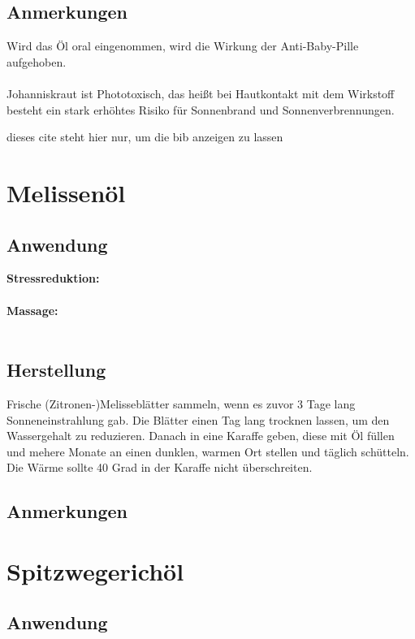 \subsection{Anmerkungen}

Wird das Öl oral eingenommen, wird die Wirkung der Anti-Baby-Pille aufgehoben.\\ \\
Johanniskraut ist Phototoxisch, das heißt bei Hautkontakt mit dem Wirkstoff besteht ein stark erhöhtes Risiko für Sonnenbrand und Sonnenverbrennungen.



dieses cite steht hier nur, um die bib anzeigen zu lassen~\cite{lichtenstern1983schwester}


\section{Melissenöl}

\subsection{Anwendung}

\textbf{Stressreduktion:} \\ \\
\textbf{Massage:} \\ \\


\subsection{Herstellung}

Frische (Zitronen-)Melisseblätter sammeln, wenn es zuvor 3 Tage lang Sonneneinstrahlung gab. Die Blätter einen Tag lang trocknen lassen, um den Wassergehalt zu reduzieren. Danach in eine Karaffe geben, diese mit Öl füllen und mehere Monate an einen dunklen, warmen Ort stellen und täglich schütteln. Die Wärme sollte 40 Grad in der Karaffe nicht überschreiten.

\subsection{Anmerkungen}




\section{Spitzwegerichöl}

\subsection{Anwendung}

